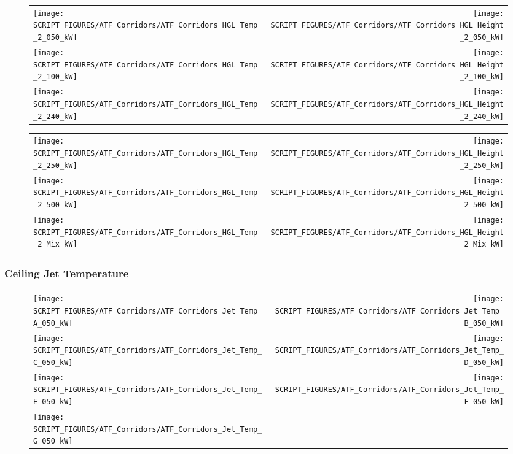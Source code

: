 \begin{figure}[!ht]
\begin{tabular*}{\textwidth}{l@{\extracolsep{\fill}}r}
\texttt{[image: SCRIPT\_FIGURES/ATF\_Corridors/ATF\_Corridors\_HGL\_Temp\_2\_050\_kW]} &
\texttt{[image: SCRIPT\_FIGURES/ATF\_Corridors/ATF\_Corridors\_HGL\_Height\_2\_050\_kW]} \\
\texttt{[image: SCRIPT\_FIGURES/ATF\_Corridors/ATF\_Corridors\_HGL\_Temp\_2\_100\_kW]} &
\texttt{[image: SCRIPT\_FIGURES/ATF\_Corridors/ATF\_Corridors\_HGL\_Height\_2\_100\_kW]} \\
\texttt{[image: SCRIPT\_FIGURES/ATF\_Corridors/ATF\_Corridors\_HGL\_Temp\_2\_240\_kW]} &
\texttt{[image: SCRIPT\_FIGURES/ATF\_Corridors/ATF\_Corridors\_HGL\_Height\_2\_240\_kW]}
\end{tabular*}
\end{figure}

\begin{figure}[!ht]
\begin{tabular*}{\textwidth}{l@{\extracolsep{\fill}}r}
\texttt{[image: SCRIPT\_FIGURES/ATF\_Corridors/ATF\_Corridors\_HGL\_Temp\_2\_250\_kW]} &
\texttt{[image: SCRIPT\_FIGURES/ATF\_Corridors/ATF\_Corridors\_HGL\_Height\_2\_250\_kW]} \\
\texttt{[image: SCRIPT\_FIGURES/ATF\_Corridors/ATF\_Corridors\_HGL\_Temp\_2\_500\_kW]} &
\texttt{[image: SCRIPT\_FIGURES/ATF\_Corridors/ATF\_Corridors\_HGL\_Height\_2\_500\_kW]} \\
\texttt{[image: SCRIPT\_FIGURES/ATF\_Corridors/ATF\_Corridors\_HGL\_Temp\_2\_Mix\_kW]} &
\texttt{[image: SCRIPT\_FIGURES/ATF\_Corridors/ATF\_Corridors\_HGL\_Height\_2\_Mix\_kW]}
\end{tabular*}
\end{figure}

\clearpage

\subsubsection{Ceiling Jet Temperature}

\begin{figure}[!ht]
\begin{tabular*}{\textwidth}{l@{\extracolsep{\fill}}r}
\texttt{[image: SCRIPT\_FIGURES/ATF\_Corridors/ATF\_Corridors\_Jet\_Temp\_A\_050\_kW]} &
\texttt{[image: SCRIPT\_FIGURES/ATF\_Corridors/ATF\_Corridors\_Jet\_Temp\_B\_050\_kW]} \\
\texttt{[image: SCRIPT\_FIGURES/ATF\_Corridors/ATF\_Corridors\_Jet\_Temp\_C\_050\_kW]} &
\texttt{[image: SCRIPT\_FIGURES/ATF\_Corridors/ATF\_Corridors\_Jet\_Temp\_D\_050\_kW]} \\
\texttt{[image: SCRIPT\_FIGURES/ATF\_Corridors/ATF\_Corridors\_Jet\_Temp\_E\_050\_kW]} &
\texttt{[image: SCRIPT\_FIGURES/ATF\_Corridors/ATF\_Corridors\_Jet\_Temp\_F\_050\_kW]} \\
\texttt{[image: SCRIPT\_FIGURES/ATF\_Corridors/ATF\_Corridors\_Jet\_Temp\_G\_050\_kW]} &
\end{tabular*}
\label{ATF_Corridors_Jet_Temp_50_kW}
\end{figure}

